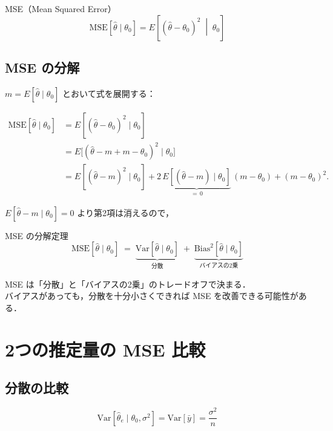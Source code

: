\documentclass[lualatex,ja=standard,a4paper,12pt]{bxjsarticle}
\begin{document}
\begin{defbox}{MSE（Mean Squared Error）}
\[
  \mathrm{MSE}[\hat{\theta} \mid \theta_0]
  = E\!\left[(\hat{\theta} - \theta_0)^2 \;\middle|\; \theta_0\right]
\]
\end{defbox}

\subsection*{MSE の分解}

$m = E[\hat{\theta} \mid \theta_0]$ とおいて式を展開する：

\begin{align*}
  \mathrm{MSE}[\hat{\theta} \mid \theta_0]
  &= E[(\hat{\theta} - \theta_0)^2 \mid \theta_0] \\
  &= E\!\bigl[(\hat{\theta} - m + m - \theta_0)^2 \mid \theta_0\bigr] \\
  &= E[(\hat{\theta} - m)^2 \mid \theta_0]
   + 2\,\underbrace{E[(\hat{\theta}-m) \mid \theta_0]}_{=\,0}\,(m-\theta_0)
   + (m - \theta_0)^2.
\end{align*}

$E[\hat{\theta} - m \mid \theta_0] = 0$ より第2項は消えるので，

\begin{thmbox}{MSE の分解定理}
\[
  \mathrm{MSE}[\hat{\theta} \mid \theta_0]
  \;=\;
  \underbrace{\mathrm{Var}[\hat{\theta} \mid \theta_0]}_{\text{分散}}
  \;+\;
  \underbrace{\mathrm{Bias}^2[\hat{\theta} \mid \theta_0]}_{\text{バイアスの2乗}}
\]
\end{thmbox}

\begin{pointbox}
MSE は「分散」と「バイアスの2乗」のトレードオフで決まる．\\
バイアスがあっても，分散を十分小さくできれば MSE を改善できる可能性がある．
\end{pointbox}

\section{2つの推定量の MSE 比較}

\subsection*{分散の比較}

\[
  \mathrm{Var}[\hat{\theta}_e \mid \theta_0, \sigma^2]
  = \mathrm{Var}\!\left[\bar{y}\right] = \frac{\sigma^2}{n}
\]
\end{document}
